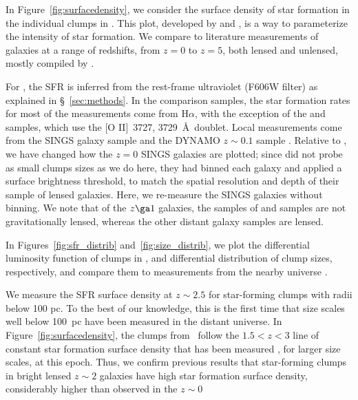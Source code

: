 In Figure~\ref{fig:surfacedensity}, we consider the surface density of star formation
in the individual clumps in \arcname.
This plot, developed by \citet{Livermore:2012gw} and \citet{Livermore:2015ck}, 
is a way to parameterize the intensity of star formation.
We compare to literature measurements of galaxies at
a range of redshifts, from $z=0$ to $z=5$, both lensed and unlensed, 
mostly compiled by  \citet{Livermore:2015ck}.

For \arcname, the SFR is inferred from the rest-frame ultraviolet
(F606W filter) as explained in \S~\ref{sec:methods}.
In the comparison samples, the star formation rates for most of the
measurements come from H$\alpha$, 
with the exception of the \citet{Swinbank:2007er} and
\citet{Swinbank:2009bb} samples, 
which use the [O II]~3727, 3729~\AA\ doublet. 
Local measurements come from the SINGS galaxy sample \citep{Kennicutt:2003jt} and 
the DYNAMO $z\sim 0.1$ sample \citep{Fisher:2016jp}.  
Relative to \citet{Livermore:2015ck}, we have changed how the $z=0$ SINGS galaxies 
are plotted; since \citet{Livermore:2015ck} did not probe as small
clumps sizes as we do here, they had binned each galaxy and applied a surface brightness threshold,  
to match the spatial resolution and depth of their sample of lensed galaxies.
Here, we re-measure the SINGS galaxies without binning.  %
We note that of the $z\ga 1$ galaxies, the %
samples of  \citet{Swinbank:2012gs} and %
\citet{Wisnioski:2012cba} samples are not gravitationally lensed, whereas 
the other distant galaxy samples are lensed. 

In Figures~\ref{fig:sfr_distrib} and~\ref{fig:size_distrib}, we plot the differential luminosity
function of clumps in \arcname, and differential distribution of clump
sizes, respectively, and compare them to measurements from the nearby universe \citep{Liu:2013fw}.

We measure the SFR surface density at $z\sim2.5$ for star-forming clumps 
with radii below 100 pc.  To the best of our knowledge, this is the first time 
that size scales well below 100~pc have been measured in the distant universe. 
In Figure~\ref{fig:surfacedensity}, the clumps from \arcname\ 
follow the $1.5<z<3$ line of constant star formation surface density 
that has been measured \citep{Livermore:2015ck},  for larger size scales, at this epoch.
Thus, we confirm previous results \citep{Livermore:2012gw, Livermore:2015ck} 
that star-forming clumps in bright lensed
$z\sim2$ galaxies have high star formation surface density, 
considerably higher than observed in the  $z\sim 0$ 

